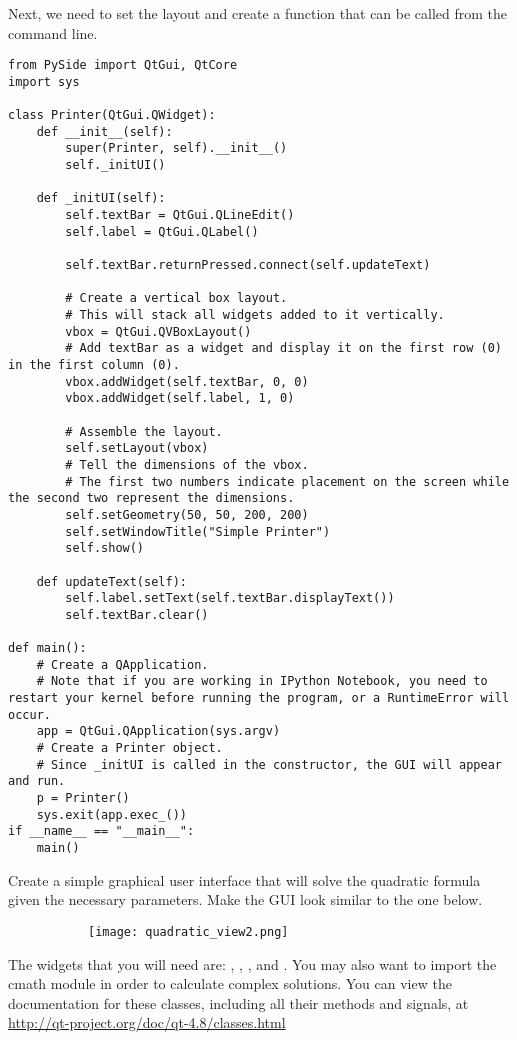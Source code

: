 Next, we need to set the layout and create a function that can be called from the command line.

\begin{lstlisting}
from PySide import QtGui, QtCore
import sys

class Printer(QtGui.QWidget):
	def __init__(self):
		super(Printer, self).__init__()
		self._initUI()

	def _initUI(self):
		self.textBar = QtGui.QLineEdit()
		self.label = QtGui.QLabel()
		
		self.textBar.returnPressed.connect(self.updateText)
	
		# Create a vertical box layout.
		# This will stack all widgets added to it vertically.
		vbox = QtGui.QVBoxLayout()
		# Add textBar as a widget and display it on the first row (0) in the first column (0).
        vbox.addWidget(self.textBar, 0, 0)
		vbox.addWidget(self.label, 1, 0)
		
		# Assemble the layout.
		self.setLayout(vbox)
		# Tell the dimensions of the vbox.
		# The first two numbers indicate placement on the screen while the second two represent the dimensions.
		self.setGeometry(50, 50, 200, 200)
		self.setWindowTitle("Simple Printer")
		self.show()
	
	def updateText(self):
		self.label.setText(self.textBar.displayText())
		self.textBar.clear()
		
def main():
	# Create a QApplication.
    # Note that if you are working in IPython Notebook, you need to restart your kernel before running the program, or a RuntimeError will occur.
	app = QtGui.QApplication(sys.argv)
	# Create a Printer object.
    # Since _initUI is called in the constructor, the GUI will appear and run.
	p = Printer()
	sys.exit(app.exec_())
if __name__ == "__main__":
	main()

\end{lstlisting}

\begin{problem}
Create a simple graphical user interface that will solve the quadratic formula given the necessary parameters.
Make the GUI look similar to the one below.
\begin{figure}[H]
\centering
\begin{comment}
\begin{subfigure}[b]{.49\textwidth}
\texttt{[image: quadratic\_view.png]}
\end{subfigure}
\end{comment}
\begin{subfigure}[b]{.49\textwidth}
\texttt{[image: quadratic\_view2.png]}
\end{subfigure}
\end{figure}
The widgets that you will need are: , , , and . You may also want to import the cmath module in order to calculate complex solutions.
You can view the documentation for these classes, including all their methods and signals, at \url{http://qt-project.org/doc/qt-4.8/classes.html}
\label{prob:quadCalc}
\end{problem}


